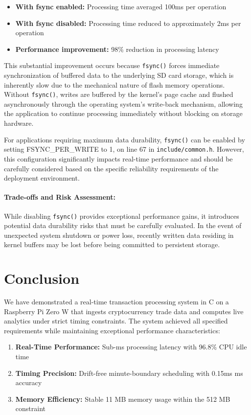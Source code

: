 \documentclass[12pt,a4paper]{article}
\begin{document}
\begin{itemize}
\item \textbf{With fsync enabled:} Processing time averaged 100ms per operation
\item \textbf{With fsync disabled:} Processing time reduced to approximately 2ms per operation
\item \textbf{Performance improvement:} 98\% reduction in processing latency
\end{itemize}

This substantial improvement occurs because \texttt{fsync()} forces immediate synchronization of buffered data to the underlying SD card storage, which is inherently slow due to the mechanical nature of flash memory operations. Without \texttt{fsync()}, writes are buffered by the kernel's page cache and flushed asynchronously through the operating system's write-back mechanism, allowing the application to continue processing immediately without blocking on storage hardware.

For applications requiring maximum data durability, \texttt{fsync()} can be enabled by setting FSYNC\_PER\_WRITE to 1, on line 67 in \texttt{include/common.h}. However, this configuration significantly impacts real-time performance and should be carefully considered based on the specific reliability requirements of the deployment environment.

\paragraph{Trade-offs and Risk Assessment:} While disabling \texttt{fsync()} provides exceptional performance gains, it introduces potential data durability risks that must be carefully evaluated. In the event of unexpected system shutdown or power loss, recently written data residing in kernel buffers may be lost before being committed to persistent storage.

\section{Conclusion}

We have demonstrated a real-time transaction processing system in C on a Raspberry Pi Zero W that ingests cryptocurrency trade data and computes live analytics under strict timing constraints. The system achieved all specified requirements while maintaining exceptional performance characteristics:

\begin{enumerate}
    \item \textbf{Real-Time Performance:} Sub-ms processing latency with 96.8\% CPU idle time
    \item \textbf{Timing Precision:} Drift-free minute-boundary scheduling with 0.15ms ms accuracy
    \item \textbf{Memory Efficiency:} Stable 11 MB memory usage within the 512 MB constraint
\end{enumerate}    
\end{document}
